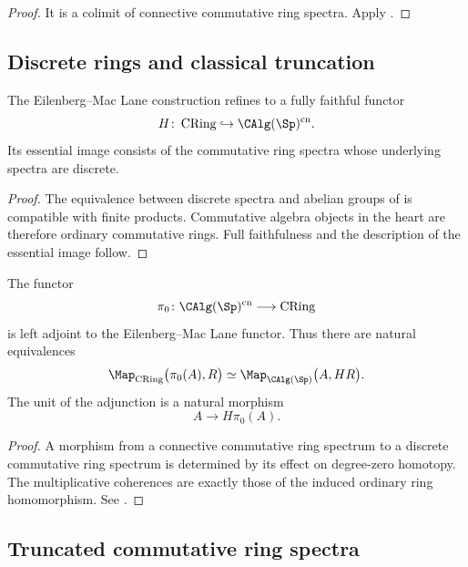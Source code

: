 \begin{proof}
It is a colimit of connective commutative ring spectra. Apply
.
\end{proof}

\subsection{Discrete rings and classical truncation}

\begin{proposition}
\label{prop:discrete-commutative-ring-spectra}
The Eilenberg--Mac Lane construction refines to a fully faithful functor
\[
    H
    \colon
    \operatorname{CRing}
    \hookrightarrow
    \CAlg(\Sp)^{\mathrm{cn}}.
\]
Its essential image consists of the commutative ring spectra whose
underlying spectra are discrete.
\end{proposition}

\begin{proof}
The equivalence between discrete spectra and abelian groups of
 is compatible with finite products.
Commutative algebra objects in the heart are therefore ordinary
commutative rings. Full faithfulness and the description of the essential
image follow.
\end{proof}

\begin{proposition}
\label{prop:pi-zero-h-adjunction}
The functor
\[
    \pi_0
    \colon
    \CAlg(\Sp)^{\mathrm{cn}}
    \longrightarrow
    \operatorname{CRing}
\]
is left adjoint to the Eilenberg--Mac Lane functor. Thus there are natural
equivalences
\[
    \Map_{\operatorname{CRing}}
    \bigl(
        \pi_0(A),R
    \bigr)
    \simeq
    \Map_{\CAlg(\Sp)}
    \bigl(
        A,H R
    \bigr).
\]
The unit of the adjunction is a natural morphism
\[
    A
    \longrightarrow
    H\pi_0(A).
\]
\end{proposition}

\begin{proof}
A morphism from a connective commutative ring spectrum to a discrete
commutative ring spectrum is determined by its effect on degree-zero
homotopy. The multiplicative coherences are exactly those of the induced
ordinary ring homomorphism. See \cite{LurieHigherAlgebra,LurieSAG}.
\end{proof}

\subsection{Truncated commutative ring spectra}

